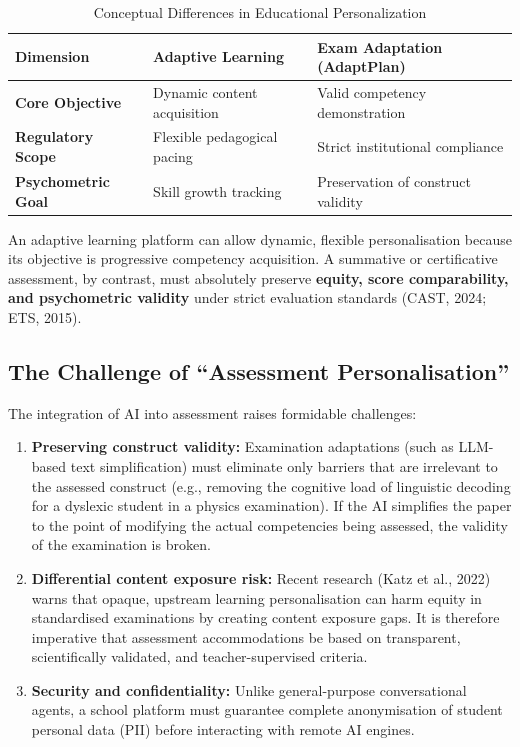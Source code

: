 \documentclass[12pt,a4paper]{report}
\begin{document}
\begin{table}[H]
    \centering
    \small
    \caption{Conceptual Differences in Educational Personalization}
    \label{tab:systemic_gap}
    \vspace{0.2cm}
    \begin{tabular}{lll}
        \toprule
        \textbf{Dimension} & \textbf{Adaptive Learning} & \textbf{Exam Adaptation (AdaptPlan)} \\
        \midrule
        \textbf{Core Objective} & Dynamic content acquisition & Valid competency demonstration \\
        \textbf{Regulatory Scope} & Flexible pedagogical pacing & Strict institutional compliance \\
        \textbf{Psychometric Goal} & Skill growth tracking & Preservation of construct validity \\
        \bottomrule
    \end{tabular}
\end{table}

An adaptive learning platform can allow dynamic, flexible personalisation because its objective is progressive competency acquisition. A summative or certificative assessment, by contrast, must absolutely preserve \textbf{equity, score comparability, and psychometric validity} under strict evaluation standards (CAST, 2024; ETS, 2015).

\subsection{The Challenge of ``Assessment Personalisation''}

The integration of AI into assessment raises formidable challenges:

\begin{enumerate}[leftmargin=*, label=\arabic*.]
  \item \textbf{Preserving construct validity:} Examination adaptations (such as LLM-based text simplification) must eliminate only barriers that are irrelevant to the assessed construct (e.g., removing the cognitive load of linguistic decoding for a dyslexic student in a physics examination). If the AI simplifies the paper to the point of modifying the actual competencies being assessed, the validity of the examination is broken.
  \item \textbf{Differential content exposure risk:} Recent research (Katz et al., 2022) warns that opaque, upstream learning personalisation can harm equity in standardised examinations by creating content exposure gaps. It is therefore imperative that assessment accommodations be based on transparent, scientifically validated, and teacher-supervised criteria.
  \item \textbf{Security and confidentiality:} Unlike general-purpose conversational agents, a school platform must guarantee complete anonymisation of student personal data (PII) before interacting with remote AI engines.
\end{enumerate}
\end{document}
